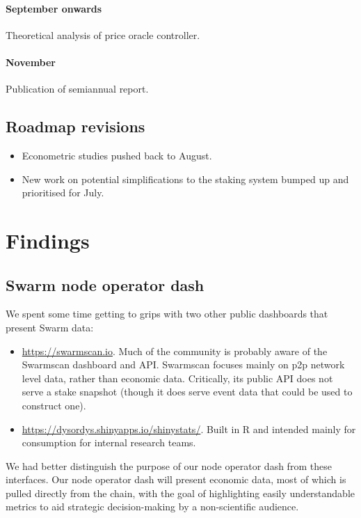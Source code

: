 \paragraph{September onwards}
%
Theoretical analysis of price oracle controller.

\paragraph{November}
%
Publication of semiannual report.


\subsection*{Roadmap revisions}

\begin{itemize}
  \item Econometric studies pushed back to August.
  \item New work on potential simplifications to the staking system bumped up and prioritised for July.
\end{itemize}



\section*{Findings}

\subsection*{Swarm node operator dash}

We spent some time getting to grips with two other public dashboards that present Swarm data:
%
\begin{itemize}
  \item \url{https://swarmscan.io}. Much of the community is probably aware of the Swarmscan dashboard and API. 
  Swarmscan focuses mainly on p2p network level data, rather than economic data.
  Critically, its public API does not serve a stake snapshot (though it does serve event data that could be used to construct one).

  \item \url{https://dysordys.shinyapps.io/shinystats/}. Built in R and intended mainly for consumption for internal research teams.
\end{itemize}
%
We had better distinguish the purpose of our node operator dash from these interfaces.
%
Our node operator dash will present economic data, most of which is pulled directly from the chain, with the goal of highlighting easily understandable metrics to aid strategic decision-making by a non-scientific audience.

